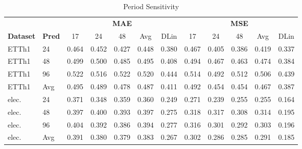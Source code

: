 \begin{table}[!htbp]
\centering
\caption{Period Sensitivity}
\label{tab:period_sensitivity}
\scriptsize
\begin{tabular}{ll ccccc ccccc}
\toprule
& & \multicolumn{5}{c}{\textbf{MAE}} & \multicolumn{5}{c}{\textbf{MSE}} \\
\cmidrule{3-7} \cmidrule{8-12}
\textbf{Dataset} & \textbf{Pred} & 17 & 24 & 48 & Avg & DLin & 17 & 24 & 48 & Avg & DLin \\
\midrule
ETTh1 & 24 & 0.464 & 0.452 & 0.427 & 0.448 & 0.380 & 0.467 & 0.405 & 0.386 & 0.419 & 0.337 \\
ETTh1 & 48 & 0.499 & 0.500 & 0.485 & 0.495 & 0.408 & 0.494 & 0.467 & 0.463 & 0.474 & 0.384 \\
ETTh1 & 96 & 0.522 & 0.516 & 0.522 & 0.520 & 0.444 & 0.514 & 0.492 & 0.512 & 0.506 & 0.439 \\
ETTh1 & Avg & 0.495 & 0.489 & 0.478 & 0.487 & 0.411 & 0.492 & 0.454 & 0.454 & 0.467 & 0.387 \\
elec. & 24 & 0.371 & 0.348 & 0.359 & 0.360 & 0.249 & 0.271 & 0.239 & 0.255 & 0.255 & 0.164 \\
elec. & 48 & 0.397 & 0.400 & 0.393 & 0.397 & 0.275 & 0.318 & 0.317 & 0.308 & 0.314 & 0.195 \\
elec. & 96 & 0.404 & 0.392 & 0.386 & 0.394 & 0.277 & 0.316 & 0.301 & 0.292 & 0.303 & 0.196 \\
elec. & Avg & 0.391 & 0.380 & 0.379 & 0.383 & 0.267 & 0.302 & 0.286 & 0.285 & 0.291 & 0.185 \\
\bottomrule
\end{tabular}
\end{table}

